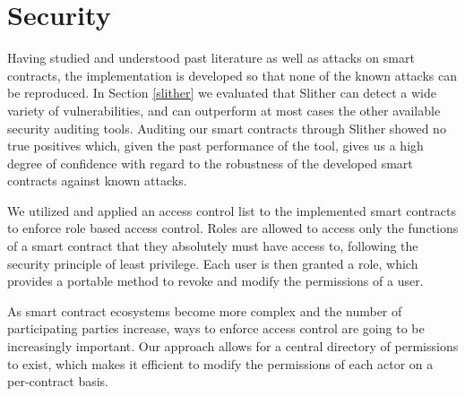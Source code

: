 

\section{Security}

Having studied and understood past literature as well as attacks on smart contracts, the implementation is developed so that none of the known attacks can be reproduced. In Section \ref{slither} we evaluated that Slither can detect a wide variety of vulnerabilities, and can outperform at most cases the other available security auditing tools. Auditing our smart contracts through Slither showed no true positives which, given the past performance of the tool, gives us a high degree of confidence with regard to the robustness of the developed smart contracts against known attacks.

We utilized and applied an access control list to the implemented smart contracts to enforce role based access control. Roles are allowed to access only the functions of a smart contract that they absolutely must have access to, following the security principle of least privilege. Each user is then granted a role, which provides a portable method to revoke and modify the permissions of a user. 

As smart contract ecosystems become more complex and the number of participating parties increase, ways to enforce access control are going to be increasingly important. Our approach allows for a central directory of permissions to exist, which makes it efficient to modify the permissions of each actor on a per-contract basis. 

